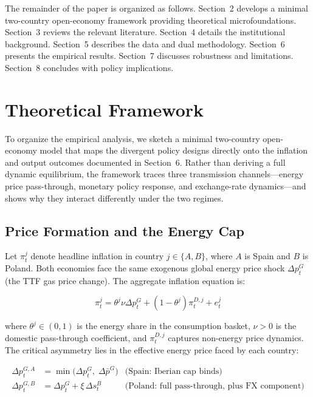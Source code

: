 \documentclass[12pt, a4paper]{article}
\begin{document}
The remainder of the paper is organized as follows. Section~2 develops a minimal two-country open-economy framework providing theoretical microfoundations. Section~3 reviews the relevant literature. Section~4 details the institutional background. Section~5 describes the data and dual methodology. Section~6 presents the empirical results. Section~7 discusses robustness and limitations. Section~8 concludes with policy implications.



\section{Theoretical Framework}

To organize the empirical analysis, we sketch a minimal two-country open-economy model that maps the divergent policy designs directly onto the inflation and output outcomes documented in Section~6. Rather than deriving a full dynamic equilibrium, the framework traces three transmission channels---energy price pass-through, monetary policy response, and exchange-rate dynamics---and shows why they interact differently under the two regimes.


\subsection{Price Formation and the Energy Cap}

Let $\pi_t^j$ denote headline inflation in country $j \in \{A, B\}$, where $A$ is Spain and $B$ is Poland. Both economies face the same exogenous global energy price shock $\Delta p_t^G$ (the TTF gas price change). The aggregate inflation equation is:

\[
\pi_t^j = \theta^j \nu \Delta p_t^{G} + (1 - \theta^j)\pi_t^{D,j} + e_t^j
\]

where $\theta^j \in (0,1)$ is the energy share in the consumption basket, $\nu > 0$ is the domestic pass-through coefficient, and $\pi_t^{D,j}$ captures non-energy price dynamics. The critical asymmetry lies in the effective energy price faced by each country:

\begin{align*}
\Delta p_t^{G,A} &= \min\!\bigl(\Delta p_t^G,\;\Delta \bar{p}^G\bigr)
  & \text{(Spain: Iberian cap binds)}\\[4pt]
\Delta p_t^{G,B} &= \Delta p_t^G + \xi\,\Delta s_t^B
  & \text{(Poland: full pass-through, plus FX component)}
\end{align*}
\end{document}
